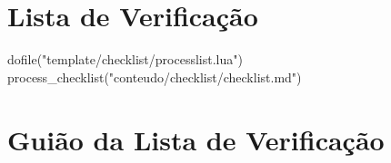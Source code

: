 %

\tableofcontents
\newpage

\section{Lista de Verificação}\label{sec:lista-de-verificacao}
\begin{small}
\begin{luacode}
dofile("template/checklist/processlist.lua")
process_checklist("conteudo/checklist/checklist.md")
\end{luacode}
\end{small}
\newpage

\section{Guião da Lista de Verificação}\label{sec:guiao-da-lista-de-verificacao}
\newpage

\printbibliography[title={Referências}]